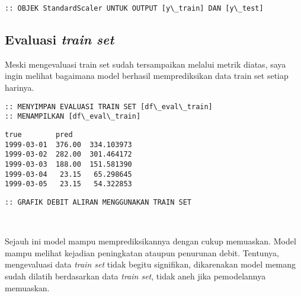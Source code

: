 \documentclass[11pt]{article}
\makeatletter
\newcommand{\boxspacing}{\kern\kvtcb@left@rule\kern\kvtcb@boxsep}
\newcommand{\prompt}[4]{
        \ttfamily\llap{{\color{#2}[#3]:\hspace{3pt}#4}}\vspace{-\baselineskip}
    }
\makeatother
\begin{document}
    \begin{Verbatim}[commandchars=\\\{\}]
:: OBJEK StandardScaler UNTUK OUTPUT [y\_train] DAN [y\_test]
    \end{Verbatim}

    \hypertarget{evaluasi-train-set}{%
\subsection{\texorpdfstring{Evaluasi \emph{train
set}}{Evaluasi train set}}\label{evaluasi-train-set}}

Meski mengevaluasi train set sudah tersampaikan melalui metrik diatas,
saya ingin melihat bagaimana model berhasil memprediksikan data train
set setiap harinya.

    \begin{Verbatim}[commandchars=\\\{\}]
:: MENYIMPAN EVALUASI TRAIN SET [df\_eval\_train]
:: MENAMPILKAN [df\_eval\_train]
    \end{Verbatim}

            \begin{tcolorbox}[breakable, size=fbox, boxrule=.5pt, pad at break*=1mm, opacityfill=0]
\prompt{Out}{outcolor}{60}{\boxspacing}
\begin{Verbatim}[commandchars=\\\{\}]
              true        pred
1999-03-01  376.00  334.103973
1999-03-02  282.00  301.464172
1999-03-03  188.00  151.581390
1999-03-04   23.15   65.298645
1999-03-05   23.15   54.322853
\end{Verbatim}
\end{tcolorbox}
        
    \begin{Verbatim}[commandchars=\\\{\}]
:: GRAFIK DEBIT ALIRAN MENGGUNAKAN TRAIN SET
    \end{Verbatim}

    \begin{center}
    \end{center}
    { \hspace*{\fill} \\}
    
    Sejauh ini model mampu memprediksikannya dengan cukup memuaskan. Model
mampu melihat kejadian peningkatan ataupun penurunan debit. Tentunya,
mengevaluasi data \emph{train set} tidak begitu signifikan, dikarenakan
model memang sudah dilatih berdasarkan data \emph{train set}, tidak aneh
jika pemodelannya memuaskan.
\end{document}
